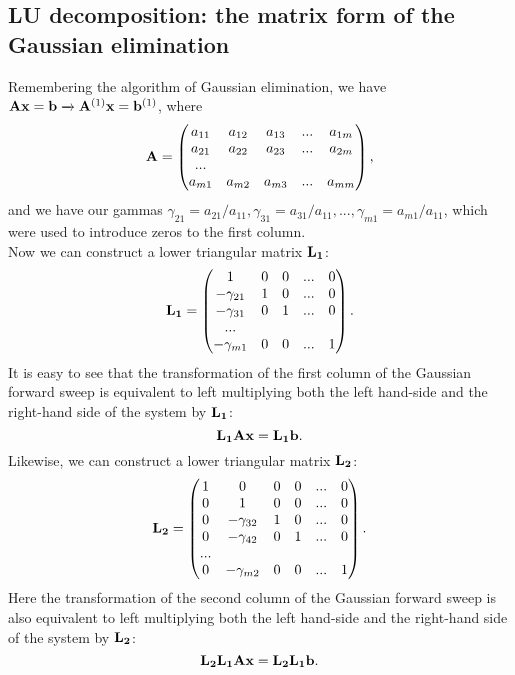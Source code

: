 \documentclass{article}
\begin{document}
\subsection{LU decomposition: the matrix form of the Gaussian elimination}

Remembering the algorithm of Gaussian elimination, we have 
${\bf A}{\bf x} = {\bf b} \xrightarrow{} {\bf A}^{(1)}{\bf x} = {\bf b}^{(1)}$, where
\[
{\bf A} = 
\begin{pmatrix}
    a_{11} & a_{12} & a_{13} & ... & a_{1m}\\
    a_{21} & a_{22} & a_{23} & ... & a_{2m}\\
    ...\\
    a_{m1} & a_{m2} & a_{m3} & ... & a_{mm}
\end{pmatrix},
\]
and we have our gammas $\gamma_{21} = a_{21}/a_{11}, \gamma_{31} = a_{31}/a_{11}, ... , \gamma_{m1} = a_{m1}/a_{11}$, which were used to introduce zeros to the first column.\\
Now we can construct a lower triangular matrix ${\bf L_1}$:
\[
{\bf L_1} = 
\begin{pmatrix}
    1 & 0 & 0 & ... & 0\\
    -\gamma_{21} & 1 & 0 & ... & 0\\
    -\gamma_{31} & 0 & 1 & ... & 0\\
    ...\\
    -\gamma_{m1} & 0 & 0 & ... & 1
\end{pmatrix}.
\]
It is easy to see that the transformation of the first column of the Gaussian forward sweep is equivalent to left multiplying both the left hand-side and the right-hand side of the system by ${\bf L_1}$:
\[
    {\bf L_1}{\bf Ax} = {\bf L_1b}.
\]
Likewise, we can construct a lower triangular matrix ${\bf L_2}$:
\[
{\bf L_2} = 
\begin{pmatrix}
    1 & 0 & 0 & 0 & ... & 0\\
    0 & 1 & 0 & 0 & ... & 0\\
    0 & -\gamma_{32} & 1 & 0 & ... & 0\\
    0 & -\gamma_{42} & 0 & 1 & ... & 0\\
    ...\\
    0 & -\gamma_{m2} & 0 & 0 & ... & 1
\end{pmatrix}.
\]
Here the transformation of the second column of the Gaussian forward sweep is also equivalent to left multiplying both the left hand-side and the right-hand side of the system by ${\bf L_2}$:
\[
    {\bf L_2}{\bf L_1}{\bf Ax} = {\bf L_2}{\bf L_1b}.
\]
\end{document}
